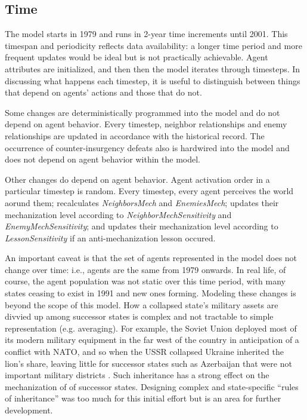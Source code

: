 \documentclass{article}
\begin{document}
\subsection{Time}

The model starts in 1979 and runs in 2-year time increments until 2001. This
timespan and periodicity reflects data availability: a longer time period and
more frequent updates would be ideal but is not practically achievable. Agent
attributes are initialized, and then then the model iterates through timesteps. 
In discussing what happens each timestep, it is useful to distinguish between
things that depend on agents' actions and those that do not.

Some changes are deterministically programmed into the model and do not depend on
agent behavior. Every timestep, neighbor relationships and enemy relationships
are updated in accordance with the historical record. The occurrence of
counter-insurgency defeats also is hardwired into the model and does not depend
on agent behavior within the model.

Other changes do depend on agent behavior. Agent activation order in a
particular timestep is random. Every timestep, every agent perceives the world
aorund them; recalculates \textit{NeighborsMech} and \textit{EnemiesMech};
updates their mechanization level according to \textit{NeighborMechSensitivity}
and \textit{EnemyMechSensitivity}; and updates their mechanization level
according to \textit{LessonSensitivity} if an anti-mechanization lesson occured.

An important caveat is that the set of agents represented in the model does not
change over time: i.e., agents are the same from 1979 onwards. In real life,
of course, the agent population was not static over this time period, with many
states ceasing to exist in 1991 and new ones forming. Modeling these changes is
beyond the scope of this model. How a collapsed state's military assets are divvied up
among successor states is complex and not tractable to simple representation
(e.g. averaging). For example, the Soviet Union deployed most of its modern
military equipment in the far west of the country in anticipation of a conflict
with NATO, and so when the USSR collapsed Ukraine inherited the lion's share, leaving
little for successor states such as Azerbaijan that were not important military
districts \citep{roy1993military}. Such inheritance has
a strong effect on the mechanization of of successor states. Designing
complex and state-specific ``rules of inheritance'' was too much for this
initial effort but is an area for further development.
\end{document}
